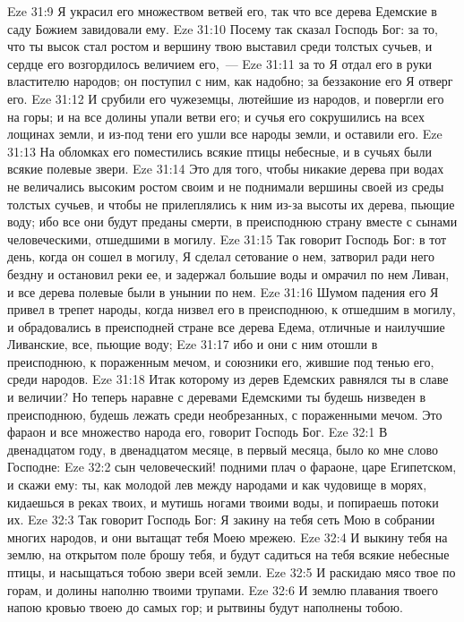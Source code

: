 \vs Eze 31:9 Я украсил его множеством ветвей его, так что все дерева Едемские в саду Божием завидовали ему.
\vs Eze 31:10 Посему так сказал Господь Бог: за то, что ты высок стал ростом и вершину твою выставил среди толстых сучьев, и сердце его возгордилось величием его,~---
\vs Eze 31:11 за то Я отдал его в руки властителю народов; он поступил с ним, как надобно; за беззаконие его Я отверг его.
\vs Eze 31:12 И срубили его чужеземцы, лютейшие из народов, и повергли его на горы; и на все долины упали ветви его; и сучья его сокрушились на всех лощинах земли, и из-под тени его ушли все народы земли, и оставили его.
\vs Eze 31:13 На обломках его поместились всякие птицы небесные, и в сучьях были всякие полевые звери.
\vs Eze 31:14 Это для того, чтобы никакие дерева при водах не величались высоким ростом своим и не поднимали вершины своей из среды толстых сучьев, и чтобы не прилеплялись к ним из-за высоты их дерева, пьющие воду; ибо все они будут преданы смерти, в преисподнюю страну вместе с сынами человеческими, отшедшими в могилу.
\vs Eze 31:15 Так говорит Господь Бог: в тот день, когда он сошел в могилу, Я сделал сетование о нем, затворил ради него бездну и остановил реки ее, и задержал большие воды и омрачил по нем Ливан, и все дерева полевые были в унынии по нем.
\vs Eze 31:16 Шумом падения его Я привел в трепет народы, когда низвел его в преисподнюю, к отшедшим в могилу, и обрадовались в преисподней стране все дерева Едема, отличные и наилучшие Ливанские, все, пьющие воду;
\vs Eze 31:17 ибо и они с ним отошли в преисподнюю, к пораженным мечом, и союзники его, жившие под тенью его, среди народов.
\vs Eze 31:18 Итак которому из дерев Едемских равнялся ты в славе и величии? Но теперь наравне с деревами Едемскими ты будешь низведен в преисподнюю, будешь лежать среди необрезанных, с пораженными мечом. Это фараон и все множество народа его, говорит Господь Бог.
\vs Eze 32:1 В двенадцатом году, в двенадцатом месяце, в первый  месяца, было ко мне слово Господне:
\vs Eze 32:2 сын человеческий! подними плач о фараоне, царе Египетском, и скажи ему: ты, как молодой лев между народами и как чудовище в морях, кидаешься в реках твоих, и мутишь ногами твоими воды, и попираешь потоки их.
\vs Eze 32:3 Так говорит Господь Бог: Я закину на тебя сеть Мою в собрании многих народов, и они вытащат тебя Моею мрежею.
\vs Eze 32:4 И выкину тебя на землю, на открытом поле брошу тебя, и будут садиться на тебя всякие небесные птицы, и насыщаться тобою звери всей земли.
\vs Eze 32:5 И раскидаю мясо твое по горам, и долины наполню твоими трупами.
\vs Eze 32:6 И землю плавания твоего напою кровью твоею до самых гор; и рытвины будут наполнены тобою.
